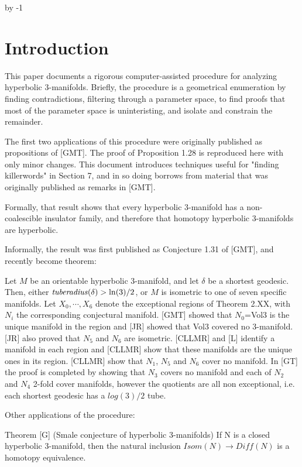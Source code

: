 \def\Arccosh{{\rm Arccosh}}
\advance\sectioncount by -1
\section{Introduction}

This paper documents a rigorous computer-assisted procedure for analyzing 
hyperbolic $3$-manifolds. Briefly, the procedure is a geometrical enumeration
by finding contradictions, filtering through a parameter space,
to find proofs that most of the parameter space is uninteristing,
and isolate and constrain the remainder.

The first two applications of this procedure were originally published
as propositions of [GMT].
The proof of Proposition 1.28 is reproduced here with only minor changes.
This document introduces techniques useful for "finding killerwords" in Section 7,
and in so doing borrows from material that was originally published as remarks
in [GMT].

Formally, that result shows that
every hyperbolic $3$-manifold has a non-coalescible insulator family,
and therefore that homotopy hyperbolic $3$-manifolds are hyperbolic.

Informally, the result was first published as Conjecture 1.31 of [GMT],
and recently become theorem:

 Let $M$ be an orientable hyperbolic $3$-manifold, and let $\delta$ be
a shortest geodesic. Then, either ${\it tuberadius}(\delta) > \ln(3)/2$, or
$M$ is isometric to one of seven specific manifolds.
\endproclaim
{}
Let $X_0, \cdots, X_6$ denote the exceptional regions of Theorem 2.XX,
with $N_i$ the corresponding conjectural manifold.
[GMT] showed that $N_0$=Vol3 is the unique manifold in the region
and [JR] showed that Vol3 covered no 3-manifold.
[JR] also proved that $N_5$ and $N_6$ are isometric.
[CLLMR] and [L] identify a manifold in each region
and [CLLMR] show that these manifolds are the unique ones in its region.
[CLLMR] show that $N_1$, $N_5$ and $N_6$ cover no manifold.
In [GT] the proof is completed by showing that $N_3$ covers no manifold
and each of $N_2$ and $N_4$ 2-fold cover manifolds,
however the quotients are all non exceptional,
i.e. each shortest geodesic has a $log(3)/2$ tube.
\enddemo

Other applications of the procedure:

Theorem [G]  (Smale conjecture of hyperbolic 3-manifolds)
If N is a closed hyperbolic 3-manifold,
then the natural inclusion $Isom(N)\to Diff(N)$ is a homotopy equivalence.

